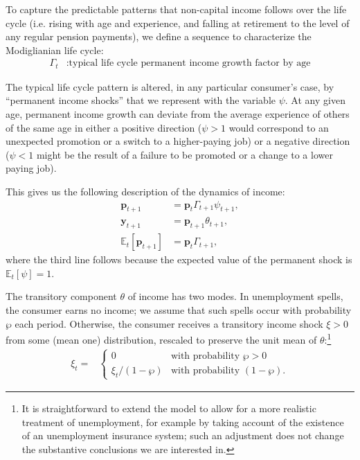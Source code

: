 \documentclass[12pt,letterpaper, fleqn]{article}
\newcommand{\yLvl}{\mathbf{y}}
\newcommand{\pLvl}{\mathbf{p}}
\newcommand{\Ex}{\mathbb{E}}
\newcommand{\permGroFac}{\Gamma}
\newcommand{\permShk}{\psi}
\newcommand{\tranShk}{\theta}
\newcommand{\pZero}{\wp}
\newcommand{\tranShkEmp}{\xi}
\begin{document}
To capture the predictable patterns that non-capital income follows over the life cycle (i.e. rising with age and experience, and falling at retirement to the level of any regular pension payments), we define a sequence to characterize the Modiglianian life cycle:
\begin{align*}
    \permGroFac_{t} & : \text{typical life cycle permanent income growth factor by age}
\end{align*}

The typical life cycle pattern is altered, in any particular consumer's case, by ``permanent income shocks'' that we represent with the variable $\permShk$.
At any given age, permanent income growth can deviate from the average experience of others of the same age in either a positive direction ($\psi>1$ would correspond to an unexpected promotion or a switch to a higher-paying job) or a negative direction ($\psi < 1$ might be the result of a failure to be promoted or a change to a lower paying job).

This gives us the following description of the dynamics of income:
\begin{align}
    \pLvl_{t+1} & = \pLvl_{t} \permGroFac_{t+1} \permShk_{t+1}, \\
    \yLvl_{t+1} & = \pLvl_{t+1} \tranShk_{t+1}, \\
    \Ex_{t}[\pLvl_{t+1}] & = \pLvl_{t} \permGroFac_{t+1},
\end{align}
where the third line follows because the expected value of the permanent shock is $\Ex_{t}[\permShk]=1$.

The transitory component $\tranShk$ of income has two modes.
In unemployment spells, the consumer earns no income; we assume that such spells occur with probability $\pZero$ each period.
Otherwise, the consumer receives a transitory income shock $\xi > 0$ from some (mean one) distribution, rescaled to preserve the unit mean of $\tranShk$:\footnote{It is straightforward to extend the model to allow for a more realistic treatment of unemployment, for example by taking account of the existence of an unemployment insurance system; such an adjustment does not change the substantive conclusions we are interested in.}
\begin{align}
    \tranShkEmp_{t} = &
    \begin{cases}
        0\phantom{/\pZero} & \text{with probability $\pZero>0$}
        \\ \xi_{t}/(1-\pZero) & \text{with probability $(1-\pZero)$}.
    \end{cases}
\end{align}
\end{document}
